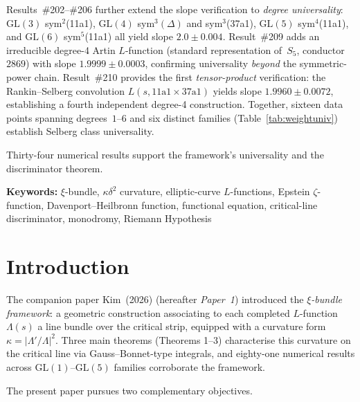 \documentclass[11pt, a4paper]{article}
\theoremstyle{plain}
\theoremstyle{definition}
\begin{document}
\begin{tcolorbox}[
  colback=lightbg, colframe=zetaviolet!60!black,
  title={\bfseries Abstract}, fonttitle=\large,
  arc=3pt, boxrule=0.8pt, toptitle=3pt, bottomtitle=3pt
]
\smallskip
\noindent Results~\#202--\#206 further extend the slope verification
to \emph{degree universality}: $\mathrm{GL}(3)$ sym$^2$(11a1),
$\mathrm{GL}(4)$ sym$^3(\Delta)$ and sym$^3$(37a1),
$\mathrm{GL}(5)$ sym$^4$(11a1), and $\mathrm{GL}(6)$
sym$^5$(11a1) all yield slope $2.0\pm 0.004$.
Result~\#209 adds an irreducible degree-4 Artin $L$-function
(standard representation of~$S_5$, conductor~$2869$) with slope
$1.9999\pm 0.0003$, confirming universality \emph{beyond} the
symmetric-power chain.  Result~\#210 provides the first
\emph{tensor-product} verification: the Rankin--Selberg convolution
$L(s, \text{11a1}\times\text{37a1})$ yields slope $1.9960\pm 0.0072$,
establishing a fourth independent degree-4 construction.
Together, sixteen data points spanning
degrees~$1$--$6$ and six distinct families (Table~\ref{tab:weightuniv})
establish Selberg class universality.

\smallskip
\noindent Thirty-four numerical results support the framework's universality
and the discriminator theorem.
\end{tcolorbox}

\vspace{0.5em}
\noindent\textbf{Keywords:} $\xi$-bundle, $\kappa\delta^{2}$ curvature,
elliptic-curve $L$-functions, Epstein $\zeta$-function, Davenport--Heilbronn
function, functional equation, critical-line discriminator, monodromy,
Riemann Hypothesis

\tableofcontents
\newpage


\section{Introduction}
\label{sec:intro}

The companion paper Kim~(2026) (hereafter \textit{Paper~1}) introduced
the \emph{$\xi$-bundle framework}: a geometric construction associating
to each completed $L$-function $\Lambda(s)$ a line bundle over the
critical strip, equipped with a curvature form $\kappa = |\Lambda'/\Lambda|^{2}$.
Three main theorems (Theorems 1--3) characterise this curvature on the
critical line via Gauss--Bonnet-type integrals, and eighty-one numerical
results across $\mathrm{GL}(1)$--$\mathrm{GL}(5)$ families corroborate the framework.

The present paper pursues two complementary objectives.
\end{document}
